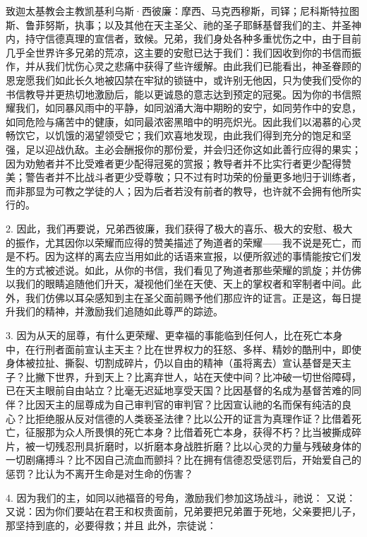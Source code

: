 致迦太基教会主教凯基利乌斯·西彼廉：摩西、马克西穆斯，司铎；尼科斯特拉图斯、鲁菲努斯，执事；以及其他在天主圣父、祂的圣子耶稣基督我们的主、并圣神内，持守信德真理的宣信者，致候。兄弟，我们身处各种多重忧伤之中，由于目前几乎全世界许多兄弟的荒凉，这主要的安慰已达于我们：我们因收到你的书信而振作，并从我们忧伤心灵之悲痛中获得了些许缓解。由此我们已能看出，神圣眷顾的恩宠愿我们如此长久地被囚禁在牢狱的锁链中，或许别无他因，只为使我们受你的书信教导并更热切地激励后，能以更诚恳的意志达到预定的冠冕。因为你的书信照耀我们，如同暴风雨中的平静，如同汹涌大海中期盼的安宁，如同劳作中的安息，如同危险与痛苦中的健康，如同最浓密黑暗中的明亮炽光。因此我们以渴慕的心灵畅饮它，以饥饿的渴望领受它；我们欢喜地发现，由此我们得到充分的饱足和坚强，足以迎战仇敌。主必会酬报你的那份爱，并会归还你这如此善行应得的果实；因为劝勉者并不比受难者更少配得冠冕的赏报；教导者并不比实行者更少配得赞美；警告者并不比战斗者更少受尊敬；只不过有时功荣的份量更多地归于训练者，而非那显为可教之学徒的人；因为后者若没有前者的教导，也许就不会拥有他所实行的。\par

2. 因此，我们再要说，兄弟西彼廉，我们获得了极大的喜乐、极大的安慰、极大的振作，尤其因你以荣耀而应得的赞美描述了殉道者的荣耀——我不说是死亡，而是不朽。因为这样的离去应当用如此的话语来宣报，以便所叙述的事情能按它们发生的方式被述说。如此，从你的书信，我们看见了殉道者那些荣耀的凯旋；并仿佛以我们的眼睛追随他们升天，凝视他们坐在天使、天上的掌权者和宰制者中间。此外，我们仿佛以耳朵感知到主在圣父面前赐予他们那应许的证言。正是这，每日提升我们的精神，并激励我们追随如此尊严的踪迹。\par

3. 因为从天的屈尊，有什么更荣耀、更幸福的事能临到任何人，比在死亡本身中，在行刑者面前宣认主天主？比在世界权力的狂怒、多样、精妙的酷刑中，即使身体被拉扯、撕裂、切割成碎片，仍以自由的精神（虽将离去）宣认基督是天主子？比撇下世界，升到天上？比离弃世人，站在天使中间？比冲破一切世俗障碍，已在天主眼前自由站立？比毫无迟延地享受天国？比因基督的名成为基督苦难的同伴？比因天主的屈尊成为自己审判官的审判官？比因宣认祂的名而保有纯洁的良心？比拒绝服从反对信德的人类亵圣法律？比以公开的证言为真理作证？比借着死亡，征服那为众人所畏惧的死亡本身？比借着死亡本身，获得不朽？比当被撕成碎片，被一切残忍刑具折磨时，以折磨本身战胜折磨？比以心灵的力量与残破身体的一切剧痛搏斗？比不因自己流血而颤抖？比在拥有信德忍受惩罚后，开始爱自己的惩罚？比认为不离开生命是对生命的伤害？\par

4. 因为我们的主，如同以祂福音的号角，激励我们参加这场战斗，祂说： 又说： 又说：因为你们要站在君王和权贵面前，兄弟要把兄弟置于死地，父亲要把儿子，那坚持到底的，必要得救；并且 此外，宗徒说：\par

